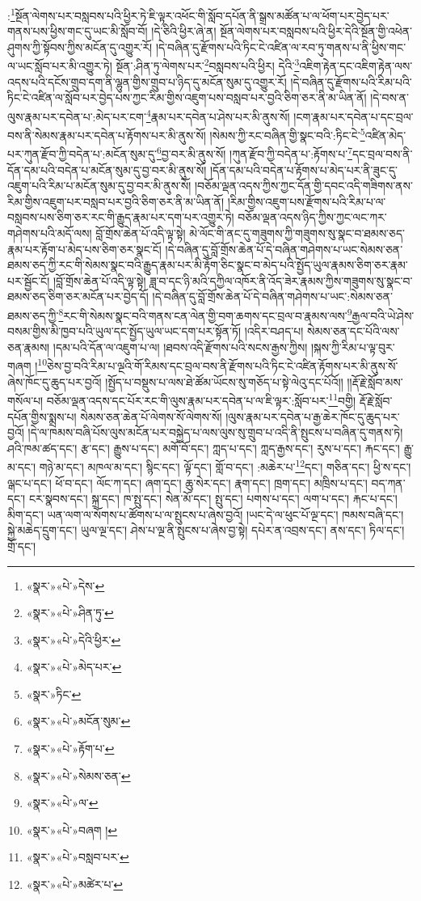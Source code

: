 :\footnote{«སྣར་»«པེ་»དེས་}སྔོན་ལེགས་པར་བསླབས་པའི་ཕྱིར་ཏེ་ཇི་ལྟར་འཕོང་གི་སློབ་དཔོན་ནི་སྒྲས་མཚོན་པ་ལ་ཕོག་པར་བྱེད་པར་གནས་པས་ཕྱིས་གང་དུ་ཡང་མི་སློབ་བོ། །དེ་ཅིའི་ཕྱིར་ཞེ་ན། སྔོན་ལེགས་པར་བསླབས་པའི་ཕྱིར་དེའི་སྔོན་གྱི་འཕེན་ཤུགས་ཀྱི་སྟོབས་ཀྱིས་མངོན་དུ་འགྱུར་རོ། །དེ་བཞིན་དུ་རྫོགས་པའི་ཏིང་ངེ་འཛིན་ལ་རབ་ཏུ་གནས་པ་ནི་ཕྱིས་གང་ལ་ཡང་སློབ་པར་མི་འགྱུར་ཏེ། སྔོན་:ཤིན་ཏུ་ལེགས་པར་\footnote{«སྣར་»«པེ་»ཤིན་ཏུ་}བསླབས་པའི་ཕྱིར། དེའི་\footnote{«སྣར་»«པེ་»དེའི་ཕྱིར་}འཇིག་རྟེན་དང་འཇིག་རྟེན་ལས་འདས་པའི་དངོས་གྲུབ་དག་ནི་ལྷུན་གྱིས་གྲུབ་པ་ཉིད་དུ་མངོན་སུམ་དུ་འགྱུར་རོ། །དེ་བཞིན་དུ་རྫོགས་པའི་རིམ་པའི་ཏིང་ངེ་འཛིན་ལ་སློབ་པར་བྱེད་པས་ཀྱང་རིམ་གྱིས་འཇུག་པས་བསླབ་པར་བྱའི་ཅིག་ཅར་ནི་མ་ཡིན་ནོ། །དེ་བས་ན་ལུས་རྣམ་པར་དབེན་པ་:མེད་པར་ངག་\footnote{«སྣར་»«པེ་»མེད་པར་}རྣམ་པར་དབེན་པ་ཤེས་པར་མི་ནུས་སོ། །ངག་རྣམ་པར་དབེན་པ་དང་བྲལ་བས་ནི་སེམས་རྣམ་པར་དབེན་པ་རྟོགས་པར་མི་ནུས་སོ། །སེམས་ཀྱི་རང་བཞིན་གྱི་སྣང་བའི་:ཏིང་ངེ་\footnote{«སྣར་»ཏིང་}འཛིན་མེད་པར་ཀུན་རྫོབ་ཀྱི་བདེན་པ་:མངོན་སུམ་དུ་\footnote{«སྣར་»«པེ་»མངོན་སུམ་}བྱ་བར་མི་ནུས་སོ། །ཀུན་རྫོབ་ཀྱི་བདེན་པ་:རྟོགས་པ་\footnote{«སྣར་»«པེ་»རྟོག་པ་}དང་བྲལ་བས་ནི་དོན་དམ་པའི་བདེན་པ་མངོན་སུམ་དུ་བྱ་བར་མི་ནུས་སོ། །དོན་དམ་པའི་བདེན་པ་རྟོགས་པ་མེད་པར་ནི་ཟུང་དུ་འཇུག་པའི་རིམ་པ་མངོན་སུམ་དུ་བྱ་བར་མི་ནུས་སོ། །བཅོམ་ལྡན་འདས་ཀྱིས་ཀྱང་དོན་གྱི་དབང་འདི་གཟིགས་ནས་རིམ་གྱིས་འཇུག་པར་བསླབ་པར་བྱའི་ཅིག་ཅར་ནི་མ་ཡིན་ནོ། །རིམ་གྱིས་འཇུག་པས་རྫོགས་པའི་རིམ་པ་ལ་བསླབས་པས་ཅིག་ཅར་རང་གི་རྒྱུད་རྣམ་པར་དག་པར་འགྱུར་ཏེ། བཅོམ་ལྡན་འདས་ཉིད་ཀྱིས་ཀྱང་ལང་ཀར་གཤེགས་པའི་མདོ་ལས། བློ་གྲོས་ཆེན་པོ་འདི་ལྟ་སྟེ། མེ་ལོང་གི་ནང་དུ་གཟུགས་ཀྱི་གཟུགས་སུ་སྣང་བ་ཐམས་ཅད་རྣམ་པར་རྟོག་པ་མེད་པས་ཅིག་ཅར་སྣང་ངོ། །དེ་བཞིན་དུ་བློ་གྲོས་ཆེན་པོ་དེ་བཞིན་གཤེགས་པ་ཡང་སེམས་ཅན་ཐམས་ཅད་ཀྱི་རང་གི་སེམས་སྣང་བའི་རྒྱུད་རྣམ་པར་མི་རྟོག་ཅིང་སྣང་བ་མེད་པའི་སྤྱོད་ཡུལ་རྣམས་ཅིག་ཅར་རྣམ་པར་སྦྱོང་ངོ། །བློ་གྲོས་ཆེན་པོ་འདི་ལྟ་སྟེ། ཟླ་བ་དང་ཉི་མའི་དཀྱིལ་འཁོར་ནི་འོད་ཟེར་རྣམས་ཀྱིས་གཟུགས་སུ་སྣང་བ་ཐམས་ཅད་ཅིག་ཅར་མངོན་པར་བྱེད་དོ། །དེ་བཞིན་དུ་བློ་གྲོས་ཆེན་པོ་དེ་བཞིན་གཤེགས་པ་ཡང་:སེམས་ཅན་ཐམས་ཅད་ཀྱི་\footnote{«སྣར་»«པེ་»སེམས་ཅན་}རང་གི་སེམས་སྣང་བའི་གནས་ངན་ལེན་གྱི་བག་ཆགས་དང་བྲལ་བ་རྣམས་ལས་\footnote{«སྣར་»«པེ་»ལ་}རྒྱལ་བའི་ཡེ་ཤེས་བསམ་གྱིས་མི་ཁྱབ་པའི་ཡུལ་དང་སྤྱོད་ཡུལ་ཡང་དག་པར་སྟོན་ཏོ། །འདིར་བཤད་པ། སེམས་ཅན་དང་པོའི་ལས་ཅན་རྣམས། །དམ་པའི་དོན་ལ་འཇུག་པ་ལ། །ཐབས་འདི་རྫོགས་པའི་སངས་རྒྱས་ཀྱིས། །སྐས་ཀྱི་རིམ་པ་ལྟ་བུར་གཞག །\footnote{«སྣར་»«པེ་»བཞག །}ཅེས་བྱ་བའི་རིམ་པ་ལྔའི་གོ་རིམས་དང་བྲལ་བས་ནི་རྫོགས་པའི་ཏིང་ངེ་འཛིན་རྟོགས་པར་མི་ནུས་སོ་ཞེས་ཁོང་དུ་ཆུད་པར་བྱའོ། །སྤྱོད་པ་བསྡུས་པ་ལས་ཐེ་ཚོམ་ཡོངས་སུ་གཅོད་པ་སྟེ་ལེའུ་དང་པོའོ།། །།རྡོ་རྗེ་སློབ་མས་གསོལ་པ། བཅོམ་ལྡན་འདས་དང་པོར་རང་གི་ལུས་རྣམ་པར་དབེན་པ་ལ་ཇི་ལྟར་:སློབ་པར་\footnote{«སྣར་»«པེ་»བསླབ་པར་}བགྱི། རྡོ་རྗེ་སློབ་དཔོན་གྱིས་སྨྲས་པ། སེམས་ཅན་ཆེན་པོ་ལེགས་སོ་ལེགས་སོ། །ལུས་རྣམ་པར་དབེན་པ་རྒྱ་ཆེར་ཁོང་དུ་ཆུད་པར་བྱའོ། །དེ་ལ་ཁམས་བཞི་པོས་ལུས་མངོན་པར་བསྐྱེད་པ་ལས་ལུས་སུ་གྲུབ་པ་འདི་ནི་སྤུངས་པ་བཞིན་དུ་གནས་ཏེ། ཤའི་ཁམ་ཚད་དང་། རྩ་དང་། རྒྱུས་པ་དང་། མགོ་བོ་དང་། ཀླད་པ་དང་། ཀླད་རྒྱས་དང་། རུས་པ་དང་། རྐང་དང་། རྒྱུ་མ་དང་། གཉེ་མ་དང་། མཁལ་མ་དང་། སྙིང་དང་། ལྟོ་དང་། གློ་བ་དང་། :མཆེར་པ་\footnote{«སྣར་»«པེ་»མཚེར་པ་}དང་། གཅིན་དང་། ཕྱི་ས་དང་། ལྒང་པ་དང་། ཕོ་བ་དང་། ལོང་ཀ་དང་། ཞག་དང་། ཆུ་སེར་དང་། རྣག་དང་། ཁྲག་དང་། མཁྲིས་པ་དང་། བད་ཀན་དང་། ངར་སྣབས་དང་། སྐྲ་དང་། ཁ་སྤུ་དང་། སེན་མོ་དང་། སྤུ་དང་། པགས་པ་དང་། ལག་པ་དང་། རྐང་པ་དང་། མིག་དང་། ཡན་ལག་ལ་སོགས་པ་ཚོགས་པ་ལ་སྤུངས་པ་ཞེས་བྱའོ། །ཡང་དེ་ལ་ཕུང་པོ་ལྔ་དང་། ཁམས་བཞི་དང་། སྐྱེ་མཆེད་དྲུག་དང་། ཡུལ་ལྔ་དང་། ཤེས་པ་ལྔ་ནི་སྤུངས་པ་ཞེས་བྱ་སྟེ། དཔེར་ན་འབྲས་དང་། ནས་དང་། ཏིལ་དང་། གྲོ་དང་། 